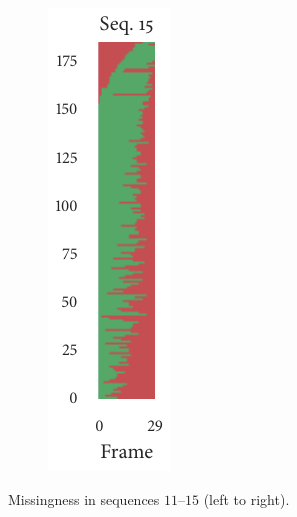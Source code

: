 \begin{figure}[b]
\begin{subfigure}[b]{0.2\textwidth}
		\includegraphics{missingness_sequence15.pdf}
	\end{subfigure}%
	\caption{Missingness in sequences $11$--$15$ (left to right).}
\end{figure}


